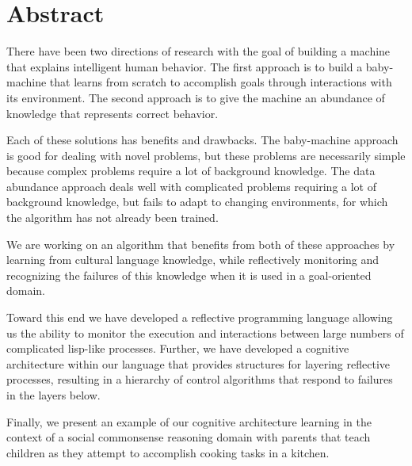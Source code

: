 \begingroup
\let\clearpage\relax
\let\cleardoublepage\relax
\let\cleardoublepage\relax

\chapter*{Abstract}

There have been two directions of research with the goal of building a
machine that explains intelligent human behavior.  The first approach
is to build a baby-machine that learns from scratch to accomplish
goals through interactions with its environment.  The second approach
is to give the machine an abundance of knowledge that represents
correct behavior.

Each of these solutions has benefits and drawbacks.  The baby-machine
approach is good for dealing with novel problems, but these problems
are necessarily simple because complex problems require a lot of
background knowledge.  The data abundance approach deals well with
complicated problems requiring a lot of background knowledge, but
fails to adapt to changing environments, for which the algorithm has
not already been trained.

We are working on an algorithm that benefits from both of these
approaches by learning from cultural language knowledge, while
reflectively monitoring and recognizing the failures of this knowledge
when it is used in a goal-oriented domain.

Toward this end we have developed a reflective programming language
allowing us the ability to monitor the execution and interactions
between large numbers of complicated lisp-like processes.  Further, we
have developed a cognitive architecture within our language that
provides structures for layering reflective processes, resulting in a
hierarchy of control algorithms that respond to failures in the layers
below.

Finally, we present an example of our cognitive architecture learning
in the context of a social commonsense reasoning domain with parents
that teach children as they attempt to accomplish cooking tasks in a
kitchen.

\endgroup

\vfill
